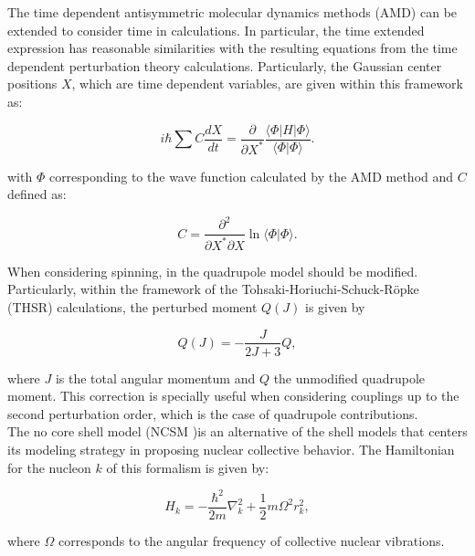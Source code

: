 \documentclass[openany]{book}
\begin{document}
The time dependent antisymmetric molecular dynamics methods (AMD) can be extended to consider time in calculations. In particular, the time extended expression has reasonable similarities with the resulting equations from the time dependent perturbation theory calculations. Particularly, the Gaussian center positions $X$, which are time dependent variables, are given within this framework as:

\begin{equation}\label{eq:micro_AMD_timeDependent}
	i \hbar \sum C \frac{dX}{dt} = \frac{\partial}{\partial X^{*}} \frac{\langle \Phi | H | \Phi \rangle }{\langle \Phi | \Phi \rangle}.
\end{equation}

with $\Phi$ corresponding to the wave function calculated by the AMD method and $C$ defined as: 

\begin{equation}\label{eq:micro_AMD_timeDependent_constants}
	C = \frac{\partial^2}{\partial X^{*} \partial X} \ln {\langle \Phi | \Phi \rangle }.
\end{equation}

When considering spinning, in the quadrupole model should be modified. Particularly, within the framework of the Tohsaki-Horiuchi-Schuck-Röpke (THSR) calculations, the perturbed moment $Q(J)$ is given by

\begin{equation}\label{eq:micro_quadrupole_J}
	Q(J) = - \frac{J}{2J + 3} Q,
\end{equation}

where $J$ is the total angular momentum and $Q$ the unmodified quadrupole moment. This correction is specially useful when considering couplings up to the second perturbation order, which is the case of quadrupole contributions. \\

The no core shell model (NCSM )is an alternative of the shell models that centers its modeling strategy in proposing nuclear collective behavior. The Hamiltonian for the nucleon $k$ of this formalism is given by: 

\begin{equation}\label{eq:micro_NCSM_Hamiltonian}
	H_k = -\frac{\hbar^2}{2m} \nabla^2_k + \frac{1}{2} m \Omega^2 r^2_k,
\end{equation}

where $\Omega$ corresponds to the angular frequency of collective nuclear vibrations. \\
\end{document}
